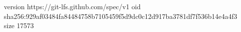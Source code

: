 version https://git-lfs.github.com/spec/v1
oid sha256:929af03484fa84484758b7105459f5d9dc0c12d917ba3781df7f536b14e4a4f3
size 17573
